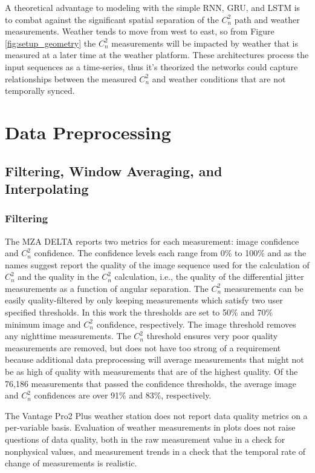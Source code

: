 A theoretical advantage to modeling with the simple RNN, GRU, and LSTM is to combat against the significant spatial separation of the $C_{n}^{2}$ path and weather measurements. Weather tends to move from west to east, so from Figure \ref{fig:setup_geometry} the $C_{n}^{2}$ measurements will be impacted by weather that is measured at a later time at the weather platform. These architectures process the input sequences as a time-series, thus it's theorized the networks could capture relationships between the measured $C_{n}^{2}$ and weather conditions that are not temporally synced. 

\section{Data Preprocessing}
\subsection{Filtering, Window Averaging, and Interpolating}
\label{sec:filt_winavg_interp}
\subsubsection{Filtering}
The MZA DELTA reports two metrics for each measurement: image confidence and $C_{n}^{2}$ confidence. The confidence levels each range from 0\% to 100\% and as the names suggest report the quality of the image sequence used for the calculation of $C_{n}^{2}$ and the quality in the $C_{n}^{2}$ calculation, i.e., the quality of the differential jitter measurements as a function of angular separation. The $C_{n}^{2}$ measurements can be easily quality-filtered by only keeping measurements which satisfy two user specified thresholds. In this work the thresholds are set to 50\% and 70\% minimum image and $C_{n}^{2}$ confidence, respectively. The image threshold removes any nighttime measurements. The $C_{n}^{2}$ threshold ensures very poor quality measurements are removed, but does not have too strong of a requirement because additional data preprocessing will average measurements that might not be as high of quality with measurements that are of the highest quality. Of the 76,186 measurements that passed the confidence thresholds, the average image and $C_{n}^{2}$ confidences are over 91\% and 83\%, respectively.

The Vantage Pro2 Plus weather station does not report data quality metrics on a per-variable basis. Evaluation of weather measurements in plots does not raise questions of data quality, both in the raw measurement value in a check for nonphysical values, and measurement trends in a check that the temporal rate of change of measurements is realistic.

